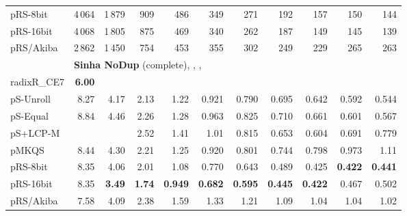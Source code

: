 \documentclass[a4paper]{myjournal}
\begin{document}
\begin{table}
\begin{tabular}{l|*{10}{r}|@{}}
     pRS-8bit & 4\,064 &     1\,879 &     909 &     486 &     349 &     271 &     192 &     157 &      150 &      144 \\
    pRS-16bit & 4\,068 &     1\,805 &     875 &     469 &     340 &     262 &     187 &     149 &      145 &      139 \\
    pRS/Akiba & 2\,862 &     1\,450 &     754 &     453 &     355 &     302 &     249 &     229 &      265 &      263 \\ \hline
& \multicolumn{10}{l|}{\textbf{Sinha NoDup} (complete), , , } \\ \cline{2-11}
radixR\_CE7 & \bf 6.00 &  &  &  &  &  &  &  &  &  \\
pS-Unroll & 8.27 &     4.17 &     2.13 &      1.22 &     0.921 &     0.790 &     0.695 &     0.642 &     0.592 &     0.544 \\
 pS-Equal & 8.84 &     4.46 &     2.26 &      1.28 &     0.963 &     0.825 &     0.710 &     0.661 &     0.601 &     0.567 \\
 pS+LCP-M &      &          &     2.52 &      1.41 &      1.01 &     0.815 &     0.653 &     0.604 &     0.691 &     0.779 \\
        pMKQS & 8.44 &     4.30 &     2.21 &      1.25 &     0.920 &     0.801 &     0.744 &     0.798 &     0.973 &      1.11 \\
     pRS-8bit & 8.35 &     4.06 &     2.01 &      1.08 &     0.770 &     0.643 &     0.489 &     0.425 & \bf 0.422 & \bf 0.441 \\
    pRS-16bit & 8.35 & \bf 3.49 & \bf 1.74 & \bf 0.949 & \bf 0.682 & \bf 0.595 & \bf 0.445 & \bf 0.422 &     0.467 &     0.502 \\
    pRS/Akiba & 7.58 &     4.09 &     2.38 &      1.59 &      1.33 &      1.21 &      1.09 &      1.04 &      1.04 &      1.02 \\ \hline
\end{tabular}
\end{table}
\end{document}
